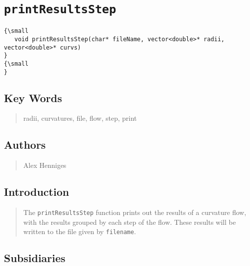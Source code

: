                       


\section*{\texttt{printResultsStep}}

\label{f0}

\begin{quotation}
{\small }
\end{quotation}

\begin{verbatim}
{\small 
   void printResultsStep(char* fileName, vector<double>* radii, vector<double>* curvs)
}
{\small    
}
\end{verbatim}

\subsection*{Key Words}

\begin{quotation}
radii, curvatures, file, flow, step, print
\end{quotation}

\subsection*{Authors}

\begin{quotation}
Alex Henniges
\end{quotation}

\subsection*{Introduction}

\begin{quotation}
The \texttt{printResultsStep} function prints out the results of a curvature
flow, with the results grouped by each step of the flow. These results will
be written to the file given by \texttt{filename}.
\end{quotation}

\subsection*{Subsidiaries}

